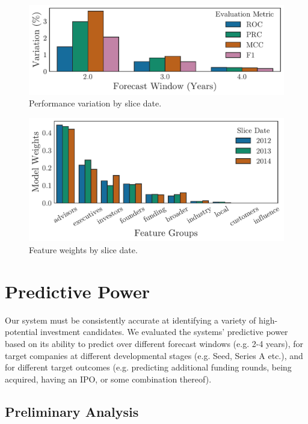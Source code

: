 \documentclass[../thesis/thesis.tex]{subfiles}
\begin{document}
\begin{figure}[!htb]
    \centering
    \includegraphics[width=\textwidth]{../figures/evaluation/performance_slice}
    \caption[Performance variation by slice date]{Performance variation by slice date.}
    \label{fig:evaluation:f1_robustness_slice}
\end{figure}

\begin{figure}[!htb]
    \centering
    \includegraphics[width=\textwidth]{../figures/evaluation/features_slice}
    \caption[Feature weights by slice date]{Feature weights by slice date.}
    \label{fig:evaluation:feature_groups_slice}
\end{figure}

\section{Predictive Power}

Our system must be consistently accurate at identifying a variety of high-potential investment candidates. We evaluated the systems' predictive power based on its ability to predict over different forecast windows (e.g. 2-4 years), for target companies at different developmental stages (e.g. Seed, Series A etc.), and for different target outcomes (e.g. predicting additional funding rounds, being acquired, having an IPO, or some combination thereof).

\subsection{Preliminary Analysis}
\end{document}
